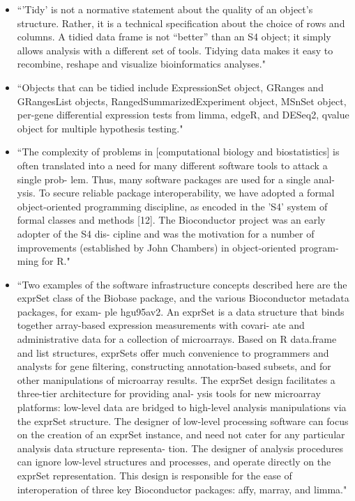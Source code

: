 \documentclass[pdftex,english,11pt,parskip=half]{scrartcl}
\begin{document}
\begin{itemize}
\item ``'Tidy' is not a normative statement about the quality of an object’s structure. Rather, it is a technical specification about the choice of rows and columns. A tidied data frame is not “better” than an S4 object; it simply allows analysis with a different set of tools. Tidying data makes it easy to recombine, reshape and visualize bioinformatics analyses." \cite{biobroom}
\item ``Objects that can be tidied include ExpressionSet object, GRanges and GRangesList objects, RangedSummarizedExperiment object, MSnSet object, per-gene differential expression tests from limma, edgeR, and DESeq2, qvalue object for multiple hypothesis testing." \cite{biobroom}
\item ``The complexity of problems in [computational biology and biostatistics] is often translated into a need for many different software tools to attack a single prob- lem. Thus, many software packages are used for a single anal- ysis. To secure reliable package interoperability, we have adopted a formal object-oriented programming discipline, as encoded in the 'S4' system of formal classes and methods [12]. The Bioconductor project was an early adopter of the S4 dis- cipline and was the motivation for a number of improvements (established by John Chambers) in object-oriented program- ming for R." \cite{gentleman2004bioconductor}
\item ``Two examples of the software infrastructure concepts described here are the exprSet class of the Biobase package, and the various Bioconductor metadata packages, for exam- ple hgu95av2. An exprSet is a data structure that binds together array-based expression measurements with covari- ate and administrative data for a collection of microarrays. Based on R data.frame and list structures, exprSets offer much convenience to programmers and analysts for gene filtering, constructing annotation-based subsets, and for other manipulations of microarray results. The exprSet design facilitates a three-tier architecture for providing anal- ysis tools for new microarray platforms: low-level data are bridged to high-level analysis manipulations via the exprSet structure. The designer of low-level processing software can focus on the creation of an exprSet instance, and need not cater for any particular analysis data structure representa- tion. The designer of analysis procedures can ignore low-level structures and processes, and operate directly on the exprSet representation. This design is responsible for the ease of interoperation of three key Bioconductor packages: affy, marray, and limma." \cite{gentleman2004bioconductor}

\end{itemize}
\end{document}
